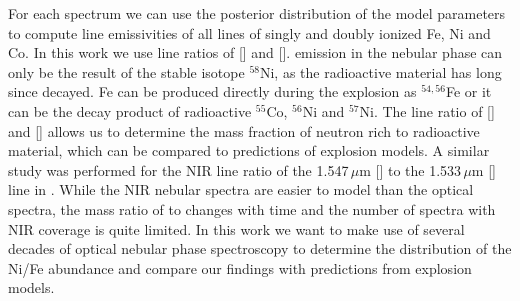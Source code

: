 \documentclass[fleqn,usenatbib]{mnras}
\begin{document}
For each spectrum we can use the posterior distribution of the model parameters to compute line emissivities of all lines of singly and doubly ionized Fe, Ni and Co. In this work we use line ratios of [] and [].  emission in the nebular phase can only be the result of the stable isotope $^{58}$Ni, as the radioactive material has long since decayed. Fe can be produced directly during the explosion as $^{54,56}$Fe or it can be the decay product of radioactive $^{55}$Co, $^{56}$Ni and $^{57}$Ni. The line ratio of [] and [] allows us to determine the mass fraction of neutron rich to radioactive material, which can be compared to predictions of explosion models. A similar study was performed for the NIR line ratio of the 1.547\,$\mu$m [] to the 1.533\,$\mu$m [] line in \citet{2018A&A...620A.200F}. While the NIR nebular spectra are easier to model than the optical spectra, the mass ratio of  to  changes with time and the number of spectra with NIR coverage is quite limited. In this work we want to make use of several decades of optical nebular phase spectroscopy to determine the distribution of the Ni/Fe abundance and compare our findings with predictions from explosion models.
\end{document}
